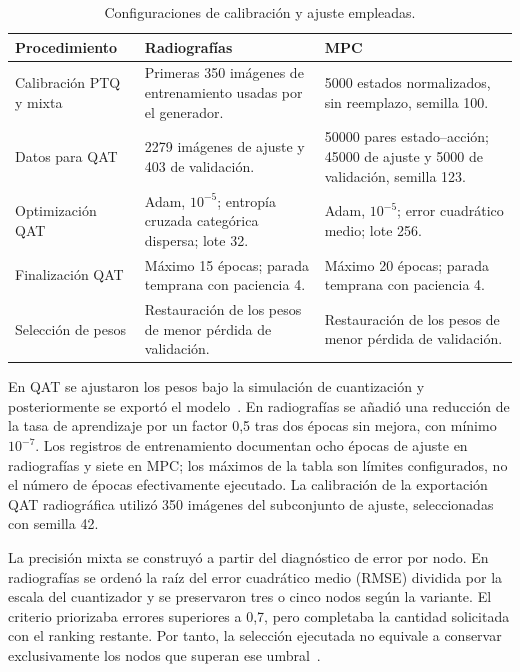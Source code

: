 \begin{table}[htbp]
\centering
\caption{Configuraciones de calibración y ajuste empleadas.}
\label{tab:ajuste_cap5}
\begingroup\small{}
\begin{tabularx}{\textwidth}{@{}>{\raggedright\arraybackslash}p{2.8cm}YY@{}}
\toprule
Procedimiento & Radiografías & MPC \\
\midrule
Calibración PTQ y mixta & Primeras 350 imágenes de entrenamiento usadas por el generador. & 5000 estados normalizados, sin reemplazo, semilla 100. \\
Datos para QAT & 2279 imágenes de ajuste y 403 de validación. & 50000 pares estado--acción; 45000 de ajuste y 5000 de validación, semilla 123. \\
Optimización QAT & Adam, $10^{-5}$; entropía cruzada categórica dispersa; lote 32. & Adam, $10^{-5}$; error cuadrático medio; lote 256. \\
Finalización QAT & Máximo 15 épocas; parada temprana con paciencia 4. & Máximo 20 épocas; parada temprana con paciencia 4. \\
Selección de pesos & Restauración de los pesos de menor pérdida de validación. & Restauración de los pesos de menor pérdida de validación. \\
\bottomrule
\end{tabularx}
\endgroup
\end{table}

En QAT se ajustaron los pesos bajo la simulación de cuantización y posteriormente se exportó el modelo~\cite{cap5_qat}. En radiografías se añadió una reducción de la tasa de aprendizaje por un factor 0,5 tras dos épocas sin mejora, con mínimo $10^{-7}$. Los registros de entrenamiento documentan ocho épocas de ajuste en radiografías y siete en MPC; los máximos de la tabla son límites configurados, no el número de épocas efectivamente ejecutado. La calibración de la exportación QAT radiográfica utilizó 350 imágenes del subconjunto de ajuste, seleccionadas con semilla 42.

La precisión mixta se construyó a partir del diagnóstico de error por nodo. En radiografías se ordenó la raíz del error cuadrático medio (RMSE) dividida por la escala del cuantizador y se preservaron tres o cinco nodos según la variante. El criterio priorizaba errores superiores a 0,7, pero completaba la cantidad solicitada con el ranking restante. Por tanto, la selección ejecutada no equivale a conservar exclusivamente los nodos que superan ese umbral~\cite{cap5_debugger,cap5_registros}.

